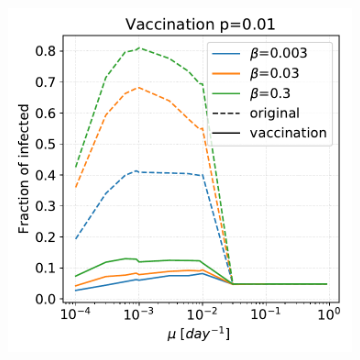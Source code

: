 \documentclass[a4paper,11pt, twocolumn]{article}
\begin{document}
\begin{figure}[t!]
\begin{subfigure}[t]{0.32\textwidth}
\caption{}
\end{subfigure}
\begin{subfigure}[t]{0.32\textwidth}
 \centering
\includegraphics[scale=0.30]{./Figure/Simulations/SIR_vax/remove_01.pdf}
\caption{}
\end{subfigure}


\end{figure}
\end{document}
